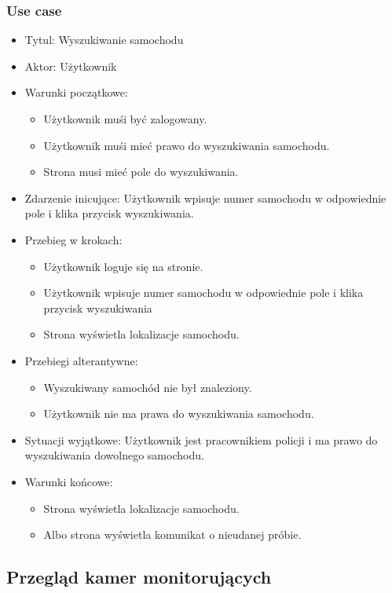 \documentclass[12pt]{article}
\begin{document}
\subsubsection{Use case}
\begin{itemize}
\item Tytul: Wyszukiwanie samochodu
\item Aktor: Użytkownik
\item Warunki początkowe: 
	\begin{itemize}
	\item Użytkownik muśi być zalogowany.
	\item Użytkownik muśi mieć prawo do wyszukiwania samochodu.
	\item Strona musi mieć pole do wyszukiwania.
	\end{itemize}
\item Zdarzenie inicujące: Użytkownik wpisuje numer samochodu w odpowiednie pole i klika przycisk wyszukiwania.
\item Przebieg w krokach:
	\begin{itemize}
	\item Użytkownik loguje się na stronie.
	\item Użytkownik wpisuje numer samochodu w odpowiednie pole i klika przycisk wyszukiwania
	\item Strona wyświetla lokalizacje samochodu.
	\end{itemize}
\item Przebiegi alterantywne: 
	\begin{itemize}
	\item Wyszukiwany samochód nie był znaleziony.
	\item Użytkownik nie ma prawa do wyszukiwania samochodu.
	\end{itemize}
\item Sytuacji wyjątkowe: Użytkownik jest pracownikiem policji i ma prawo do wyszukiwania dowolnego samochodu.
\item Warunki końcowe:
	\begin{itemize}
	\item Strona wyświetla lokalizacje samochodu.
	\item Albo strona wyświetla komunikat o nieudanej próbie.
	\end{itemize}
\end{itemize}

\subsection{Przegląd kamer monitorujących}
\end{document}
